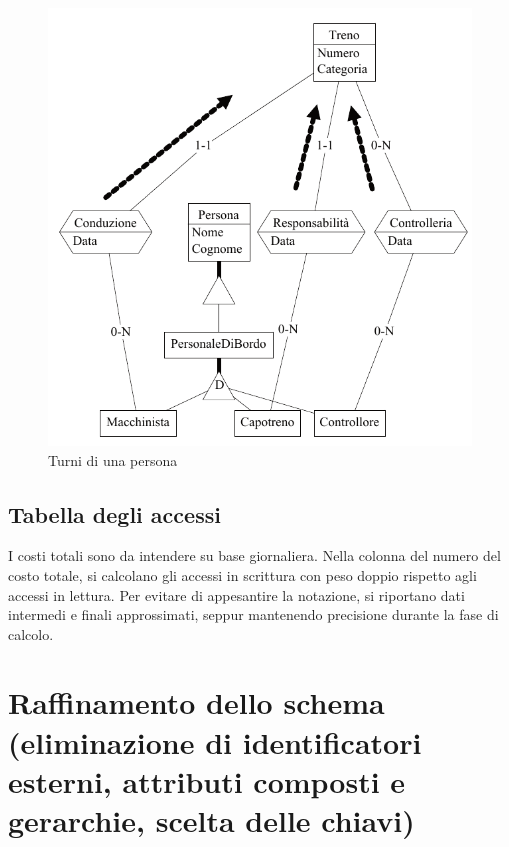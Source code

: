 \documentclass[a4paper,12pt]{report}
\begin{document}
	\begin{figure}[H]
		\begin{center}
		\includegraphics[width=\linewidth]{res/accesso/turni}
		\end{center}
		\caption{Turni di una persona}
	\end{figure}
	\subsection{Tabella degli accessi}
	\par I costi totali sono da intendere su base giornaliera. Nella colonna del numero del costo totale, si
	calcolano gli accessi in scrittura con peso doppio rispetto agli accessi in lettura. Per evitare di
	appesantire la notazione, si riportano dati intermedi e finali approssimati, seppur mantenendo
	precisione durante la fase di calcolo.
	
	\section{Raffinamento dello schema (eliminazione di identificatori esterni, attributi composti e gerarchie, scelta delle chiavi)}
\end{document}
